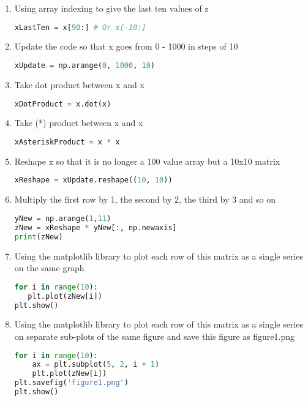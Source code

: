 \begin{enumerate}
    \item Using array indexing to give the last ten values of z
    
\begin{lstlisting}[language=Python]
xLastTen = x[90:] # Or x[-10:]
\end{lstlisting}

\item Update the code so that x goes from 0 - 1000 in steps of 10

\begin{lstlisting}[language=Python]
xUpdate = np.arange(0, 1000, 10)
\end{lstlisting}

\item Take dot product between x and x

\begin{lstlisting}[language=Python]
xDotProduct = x.dot(x)
\end{lstlisting}

\item Take (*) product between x and x

\begin{lstlisting}[language=Python]
xAsteriskProduct = x * x
\end{lstlisting}

\item Reshape x so that it is no longer a 100 value array but a 10x10 matrix

\begin{lstlisting}[language=Python]
xReshape = xUpdate.reshape((10, 10))
\end{lstlisting}

\item Multiply the first row by 1, the second by 2, the third by 3 and so on

\begin{lstlisting}[language=Python]
yNew = np.arange(1,11)
zNew = xReshape * yNew[:, np.newaxis]
print(zNew)
\end{lstlisting}

\item Using the matplotlib library to plot each row of this matrix as a single series on the same graph

\begin{lstlisting}[language=Python]
for i in range(10):
   plt.plot(zNew[i])
plt.show()
\end{lstlisting}

\item Using the matplotlib library to plot each row of this matrix as a single series on separate sub-plots of the same figure and save this figure as figure1.png

\begin{lstlisting}[language=Python]
for i in range(10):
    ax = plt.subplot(5, 2, i + 1)
    plt.plot(zNew[i])
plt.savefig('figure1.png')
plt.show()
\end{lstlisting}

\end{enumerate}



